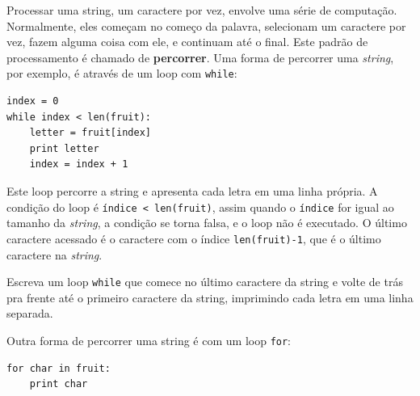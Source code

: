 {%

Processar uma string, um caractere por vez, envolve uma série de computação.
Normalmente, eles começam no começo da palavra, selecionam um caractere por
vez, fazem alguma coisa com ele, e continuam até o final. Este padrão de
processamento é chamado de {\bf percorrer}. Uma forma de percorrer uma 
{\it string}, por exemplo, é através de um loop com {\tt while}:

\beforeverb
\begin{verbatim}
index = 0
while index < len(fruit):
    letter = fruit[index]
    print letter
    index = index + 1
\end{verbatim}
\afterverb
%
%
Este loop percorre a string e apresenta cada letra em uma linha própria. A
condição do loop é {\tt índice < len(fruit)}, assim quando o {\tt índice} for
igual ao tamanho da {\it string}, a condição se torna falsa, e o loop não é
executado. O último caractere acessado é o caractere com o índice
{\tt len(fruit)-1}, que é o último caractere na {\it string}.

\begin{ex}

Escreva um loop {\tt while} que comece no último caractere da string e volte
de trás pra frente até o primeiro caractere da string, imprimindo cada letra
em uma linha separada.
\end{ex}


Outra forma de percorrer uma string é com um loop {\tt for}:

\beforeverb
\begin{verbatim}
for char in fruit:
    print char
\end{verbatim}
\afterverb
%

}
